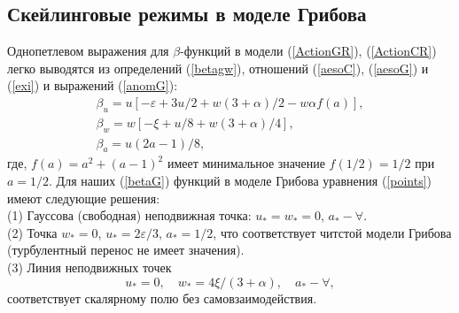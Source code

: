 \documentclass[a4paper,10pt]{article}
\begin{document}
\subsection{Скейлинговые режимы в моделе Грибова} \label{sec:GPS}
Однопетлевом выражения для $\beta$-функций в модели (\ref{ActionGR}), (\ref{ActionCR}) легко выводятся из определений (\ref{betagw}), отношений (\ref{aesoC}), (\ref{aesoG}) и (\ref{exi}) и
выражений (\ref{anomG}):
\begin{eqnarray}
\beta_{u} = u \left[ -\varepsilon+ 3u/2 + w(3+\alpha)/2 -w\alpha f(a) \right],
\nonumber \\
\beta_{w} = w \left[ -\xi +u/8 + w(3+\alpha)/4 \right],
\nonumber \\
\beta_{a} = u(2a-1)/8,
\label{betaG}
\end{eqnarray}
где, $f(a)=a^{2}+(a-1)^{2}$  имеет минимальное значение $f(1/2) =1/2$ при $a=1/2$. Для наших (\ref{betaG}) функций в моделе Грибова уравнения
(\ref{points}) имеют следующие решения:\\

(1)  Гауссова  (свободная) неподвижная точка: $u_{*}=w_{*}=0$, $a_{*}-\forall$.\\

(2) Точка  $w_{*}=0$, $u_{*}=2\varepsilon/3$, $a_{*}=1/2$, что соответствует читстой модели Грибова
(турбулентный перенос не имеет значения).\\

(3) Линия неподвижных точек
\begin{equation}
u_{*}=0, \quad w_{*}=4\xi/(3+\alpha), \quad  a_{*} - \forall,
\label{line3}
\end{equation}
соответствует  скалярному полю без самовзаимодействия.\\
\end{document}
